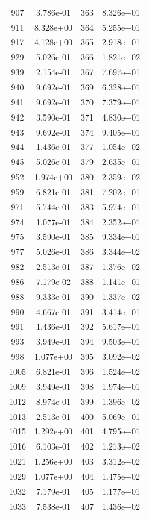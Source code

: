 \documentclass[12pt]{article}
\begin{document}
\begin{longtable}{@{}cccc@{}}
907 & 3.786e-01 & 363 & 8.326e+01 \\
911 & 8.328e+00 & 364 & 5.255e+01 \\
917 & 4.128e+00 & 365 & 2.918e+01 \\
929 & 5.026e-01 & 366 & 1.821e+02 \\
939 & 2.154e-01 & 367 & 7.697e+01 \\
940 & 9.692e-01 & 369 & 6.328e+01 \\
941 & 9.692e-01 & 370 & 7.379e+01 \\
942 & 3.590e-01 & 371 & 4.830e+01 \\
943 & 9.692e-01 & 374 & 9.405e+01 \\
944 & 1.436e-01 & 377 & 1.054e+02 \\
945 & 5.026e-01 & 379 & 2.635e+01 \\
952 & 1.974e+00 & 380 & 2.359e+02 \\
959 & 6.821e-01 & 381 & 7.202e+01 \\
971 & 5.744e-01 & 383 & 5.974e+01 \\
974 & 1.077e-01 & 384 & 2.352e+01 \\
975 & 3.590e-01 & 385 & 9.334e+01 \\
977 & 5.026e-01 & 386 & 3.344e+02 \\
982 & 2.513e-01 & 387 & 1.376e+02 \\
986 & 7.179e-02 & 388 & 1.141e+01 \\
988 & 9.333e-01 & 390 & 1.337e+02 \\
990 & 4.667e-01 & 391 & 3.414e+01 \\
991 & 1.436e-01 & 392 & 5.617e+01 \\
993 & 3.949e-01 & 394 & 9.503e+01 \\
998 & 1.077e+00 & 395 & 3.092e+02 \\
1005 & 6.821e-01 & 396 & 1.524e+02 \\
1009 & 3.949e-01 & 398 & 1.974e+01 \\
1012 & 8.974e-01 & 399 & 1.396e+02 \\
1013 & 2.513e-01 & 400 & 5.069e+01 \\
1015 & 1.292e+00 & 401 & 4.795e+01 \\
1016 & 6.103e-01 & 402 & 1.213e+02 \\
1021 & 1.256e+00 & 403 & 3.312e+02 \\
1029 & 1.077e+00 & 404 & 1.475e+02 \\
1032 & 7.179e-01 & 405 & 1.177e+01 \\
1033 & 7.538e-01 & 407 & 1.436e+02 \\

\end{longtable}
\end{document}
